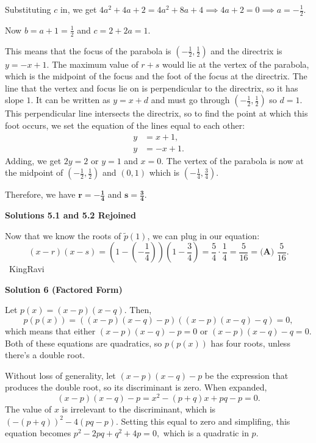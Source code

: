 \begin{enumerate}
 Substituting $c$ in, we get $4a^2+4a+2 = 4a^2+8a+4 \implies 4a+2 = 0 \implies a = -\frac{1}{2}$.

 Now $b = a+1 = \frac{1}{2}$ and $c = 2+2a = 1$.

 This means that the focus of the parabola is $\left(-\frac{1}{2}, \frac{1}{2}\right)$ and the directrix is $y = -x+1$. The maximum value of $r+s$ would lie at the vertex of the parabola, which is the midpoint of the focus and the foot of the focus at the directrix. The line that the vertex and focus lie on is perpendicular to the directrix, so it has slope $1$. It can be written as $y = x+d$ and must go through $\left(-\frac{1}{2}, \frac{1}{2}\right)$ so $d = 1$. This perpendicular line intersects the directrix, so to find the point at which this foot occurs, we set the equation of the lines equal to each other:
 \begin{align*} y &= x+1, \\ y &= -x+1. \end{align*}
Adding, we get $2y = 2$ or $y = 1$ and $x = 0$. The vertex of the parabola is now at the midpoint of $\left(-\frac{1}{2}, \frac{1}{2}\right)$ and $(0, 1)$ which is $\left(-\frac{1}{4}, \frac{3}{4}\right)$.

 Therefore, we have $\boldsymbol{r=-\frac{1}{4}}$ and $\boldsymbol{s=\frac{3}{4}}$.

 



\textbf{Solutions 5.1 and 5.2 Rejoined}

Now that we know the roots of $\tilde{p}(1)$, we can plug in our equation: 
 \[(x-r)(x-s) = \left(1-\left(-\frac{1}{4}\right)\right)\left(1-\frac{3}{4}\right) = \frac{5}{4} \cdot \frac{1}{4} = \frac{5}{16} = \boxed{\textbf{(A) } \frac{5}{16}}.\]~KingRavi

 



\textbf{Solution 6 (Factored Form)}

Let $p(x)=(x-p)(x-q).$ Then, 
 \[p(p(x))=((x-p)(x-q)-p)((x-p)(x-q)-q)=0,\] which means that either $(x-p)(x-q)-p=0$ or $(x-p)(x-q)-q=0$. Both of these equations are quadratics, so $p(p(x))$ has four roots, unless there's a double root. 

 Without loss of generality, let $(x-p)(x-q)-p$ be the expression that produces the double root, so its discriminant is zero. When expanded, 
 \[(x-p)(x-q)-p=x^2-(p+q)x+pq-p=0.\] The value of $x$ is irrelevant to the discriminant, which is $(-(p+q))^2-4(pq-p).$ Setting this equal to zero and simplifing, this equation becomes $p^2-2pq+q^2+4p=0,$ which is a quadratic in $p$.


\end{enumerate}
